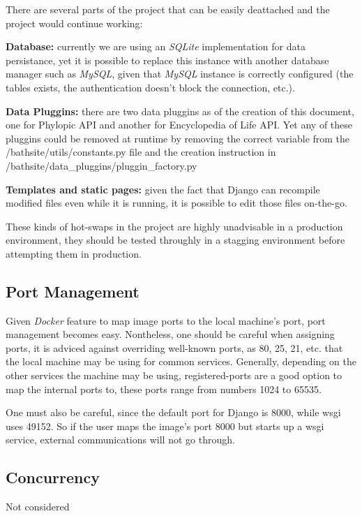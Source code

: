\documentclass[10pt]{article}
\begin{document}
There are several parts of the project that can be easily deattached and the project would continue working:

\textbf{Database:} currently we are using an \textit{SQLite} implementation for data persistance, yet it is possible to replace this instance with another database manager such as \textit{MySQL}, given that \textit{MySQL} instance is correctly configured (the tables exists, the authentication doesn't block the connection, etc.).

\textbf{Data Pluggins:} there are two data pluggins as of the creation of this document, one for Phylopic API and another for Encyclopedia of Life API. Yet any of these pluggins could be removed at runtime by removing the correct variable from the /bathsite/utils/constants.py file and the creation instruction in /bathsite/data\_pluggins/pluggin\_factory.py 

\textbf{Templates and static pages:} given the fact that Django can recompile modified files even while it is running,  it is possible to edit those files on-the-go.
 
 These kinds of hot-swaps in the project are highly unadvisable in a production environment, they should be tested throughly in a stagging environment before attempting them in production.
 
 \subsection{Port Management}
 
Given \textit{Docker} feature to map image ports to the local machine's port, port management becomes easy. Nontheless, one should be careful when assigning ports, it is adviced against overriding well-known ports, as 80, 25, 21, etc. that the local machine may be using for common services. Generally, depending on the other services the machine may be using, registered-ports are a good option to map the internal ports to, these ports range from numbers 1024 to 65535. 

One must also be careful, since the default port for Django is 8000, while wsgi uses 49152. So if the user maps the image's port 8000 but starts up a wsgi service, external communications will not go through.
 
 \subsection{Concurrency}
 
 Not considered
 
\end{document}
